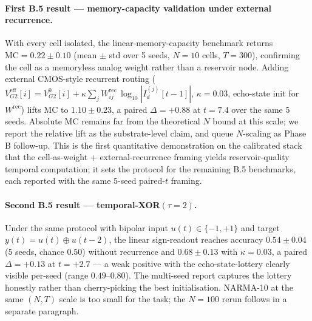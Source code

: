 \documentclass[fontsize=10pt]{article}
\begin{document}
\paragraph{First B.5 result --- memory-capacity validation under external recurrence.}
With every cell isolated, the linear-memory-capacity benchmark returns
$\mathrm{MC} = 0.22 \pm 0.10$ (mean $\pm$ std over 5 seeds, $N=10$ cells, $T=300$),
confirming the cell as a memoryless analog weight rather than a reservoir node.
Adding external CMOS-style recurrent routing
($V_{G2}^{\mathrm{eff}}[i] = V_{G2}^{0}[i] + \kappa \sum_j W^{\mathrm{rec}}_{ij}\,
\log_{10}|I_d^{(j)}[t-1]|$, $\kappa = 0.03$, echo-state init for $W^{\mathrm{rec}}$)
lifts $\mathrm{MC}$ to $\mathbf{1.10 \pm 0.23}$, a paired $\Delta = +0.88$ at
$t = 7.4$ over the same 5 seeds. Absolute $\mathrm{MC}$ remains far from the
theoretical $N$ bound at this scale; we report the relative lift as the
substrate-level claim, and queue $N$-scaling as Phase B follow-up. This is the
first quantitative demonstration on the calibrated stack that the
cell-as-weight + external-recurrence framing yields reservoir-quality temporal
computation; it sets the protocol for the remaining B.5 benchmarks, each
reported with the same 5-seed paired-$t$ framing.

\paragraph{Second B.5 result --- temporal-XOR$(\tau=2)$.}
Under the same protocol with bipolar input $u(t) \in \{-1, +1\}$ and target
$y(t) = u(t) \oplus u(t-2)$, the linear sign-readout reaches accuracy
$0.54 \pm 0.04$ (5 seeds, chance $0.50$) without recurrence and
$\mathbf{0.68 \pm 0.13}$ with $\kappa=0.03$, a paired $\Delta = +0.13$ at
$t = +2.7$ --- a weak positive with the echo-state-lottery clearly visible
per-seed (range $0.49$--$0.80$). The multi-seed report captures the lottery
honestly rather than cherry-picking the best initialisation. NARMA-10 at the
same $(N, T)$ scale is too small for the task; the $N=100$ rerun follows in
a separate paragraph.
\end{document}
